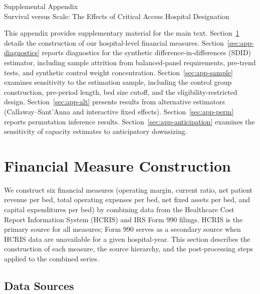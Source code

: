 \documentclass[a4paper, 12pt]{article}
\begin{document}
\onehalfspacing

\begin{center}
{\LARGE Supplemental Appendix} \\[0.5cm]
{\large Survival versus Scale: The Effects of Critical Access Hospital Designation}
\end{center}

\vspace{1cm}

This appendix provides supplementary material for the main text. Section~\ref{sec:app-financial} details the construction of our hospital-level financial measures. Section~\ref{sec:app-diagnostics} reports diagnostics for the synthetic difference-in-differences (SDID) estimator, including sample attrition from balanced-panel requirements, pre-trend tests, and synthetic control weight concentration. Section~\ref{sec:app-sample} examines sensitivity to the estimation sample, including the control group construction, pre-period length, bed size cutoff, and the eligibility-restricted design. Section~\ref{sec:app-alt} presents results from alternative estimators (Callaway--Sant'Anna and interactive fixed effects). Section~\ref{sec:app-perm} reports permutation inference results. Section~\ref{sec:app-anticipation} examines the sensitivity of capacity estimates to anticipatory downsizing.



\section{Financial Measure Construction}
\label{sec:app-financial}

We construct six financial measures (operating margin, current ratio, net patient revenue per bed, total operating expenses per bed, net fixed assets per bed, and capital expenditures per bed) by combining data from the Healthcare Cost Report Information System (HCRIS) and IRS Form 990 filings. HCRIS is the primary source for all measures; Form 990 serves as a secondary source when HCRIS data are unavailable for a given hospital-year. This section describes the construction of each measure, the source hierarchy, and the post-processing steps applied to the combined series.

\subsection{Data Sources}
\end{document}
